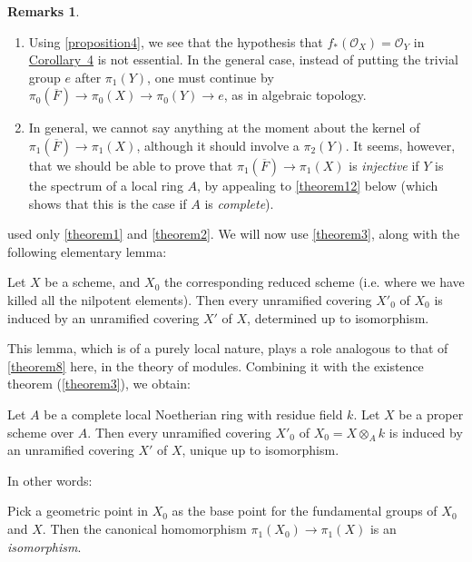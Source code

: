 \documentclass{article}
\theoremstyle{plain}
\newenvironment{theorem}[1]
  {\renewcommand\theinnercustomtheorem{#1}\innercustomtheorem}
  {\endinnercustomtheorem}
\newenvironment{lemma}[1]
  {\renewcommand\theinnercustomlemma{#1}\innercustomlemma}
  {\endinnercustomlemma}
\newenvironment{corollary}[1]
  {\renewcommand\theinnercustomcorollary{#1}\innercustomcorollary}
  {\endinnercustomcorollary}
\theoremstyle{definition}
\newtheorem*{remarks}{Remarks}
\newcommand{\sh}[1]{{\mathscr{#1}}}
\newcommand{\oldpage}[1]{\marginpar{\footnotesize$\Big\vert$ \textit{p.~#1}}}
\begin{document}
\begin{remarks}
  \begin{enumerate}[1)]
    \item Using \cref{proposition4}, we see that the hypothesis that $f_*(\sh{O}_X)=\sh{O}_Y$ in \hyperref[theorem11corollary4]{Corollary~4} is not essential.
      In the general case, instead of putting the trivial group $e$ after $\pi_1(Y)$, one must continue by $\pi_0(\overline{F})\to\pi_0(X)\to\pi_0(Y)\to e$,
\oldpage{182-24}
      as in algebraic topology.
    \item In general, we cannot say anything at the moment about the kernel of $\pi_1(\overline{F})\to\pi_1(X)$, although it should involve a $\pi_2(Y)$.
      It seems, however, that we should be able to prove that $\pi_1(\overline{F})\to\pi_1(X)$ is \emph{injective} if $Y$ is the spectrum of a local ring $A$, by appealing to \cref{theorem12} below (which shows that this is the case if $A$ is \emph{complete}).
  \end{enumerate}
\end{remarks}

 used only \cref{theorem1} and \cref{theorem2}.
We will now use \cref{theorem3}, along with the following elementary lemma:

\begin{lemma}{6}
\label{lemma6}
  Let $X$ be a scheme, and $X_0$ the corresponding reduced scheme (i.e. where we have killed all the nilpotent elements).
  Then every unramified covering $X'_0$ of $X_0$ is induced by an unramified covering $X'$ of $X$, determined up to isomorphism.
\end{lemma}

This lemma, which is of a purely local nature, plays a role analogous to that of \cref{theorem8} here, in the theory of modules.
Combining it with the existence theorem (\cref{theorem3}), we obtain:

\begin{theorem}{12}
\label{theorem12}
  Let $A$ be a complete local Noetherian ring with residue field $k$.
  Let $X$ be a proper scheme over $A$.
  Then every unramified covering $X'_0$ of $X_0=X\otimes_Ak$ is induced by an unramified covering $X'$ of $X$, unique up to isomorphism.
\end{theorem}

In other words:

\begin{corollary}{1}
\label{theorem12corollary1}
  Pick a geometric point in $X_0$ as the base point for the fundamental groups of $X_0$ and $X$.
  Then the canonical homomorphism $\pi_1(X_0)\to\pi_1(X)$ is an \emph{isomorphism}.
\end{corollary}
\end{document}
